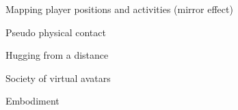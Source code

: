 
Mapping player positions and activities (mirror effect) \cite{Mao2021}

Pseudo physical contact \cite{Kulik2020}

Hugging from a distance \cite{Freeman2021}

Society of virtual avatars \cite{novak2022rise}

Embodiment \cite{moura2021}

